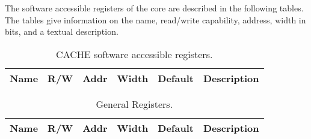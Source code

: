 
    The software accessible registers of the core are described in the following
    tables. The tables give information on the name, read/write capability, address, width in bits, and a textual description.

    \begin{table}[H]
      \centering
      \begin{tabularx}{\textwidth}{|l|c|c|c|c|X|}
        
        \hline
        \rowcolor{iob-green}
        {\bf Name} & {\bf R/W} & {\bf Addr} & {\bf Width} & {\bf Default} & {\bf Description} \\ \hline

        
     
      \end{tabularx}
      \caption{CACHE software accessible registers.}
      \label{cache_csrs_tab:is}
    \end{table}

    \begin{table}[H]
      \centering
      \begin{tabularx}{\textwidth}{|l|c|c|c|c|X|}
        
        \hline
        \rowcolor{iob-green}
        {\bf Name} & {\bf R/W} & {\bf Addr} & {\bf Width} & {\bf Default} & {\bf Description} \\ \hline

        
     
      \end{tabularx}
      \caption{General Registers.}
      \label{general_operation_csrs_tab:is}
    \end{table}
\clearpage